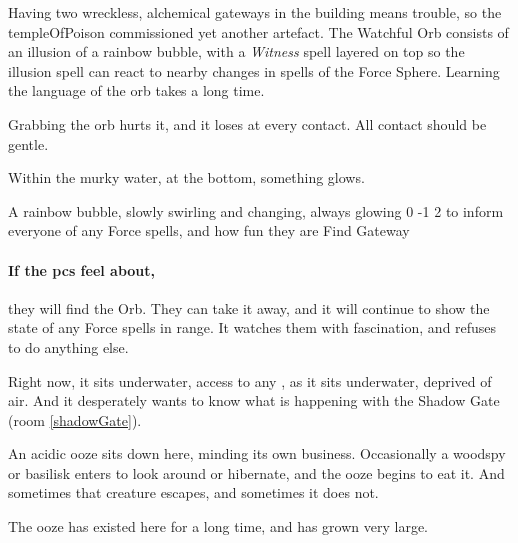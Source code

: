 
\begin{exampletext}
  Having two wreckless, alchemical gateways in the building means trouble, so the \gls{templeOfPoison} commissioned yet another \gls{artefact}.
  The Watchful Orb consists of an illusion of a rainbow bubble, with a \textit{Witness} spell layered on top so the illusion spell can react to nearby changes in spells of the Force Sphere.
  Learning the language of the orb takes a long time.

  Grabbing the orb hurts it, and it loses  at every contact.
  All contact should be gentle.
\end{exampletext}

\begin{boxtext}
  Within the murky water, at the bottom, something glows.
\end{boxtext}

  {A rainbow bubble, slowly swirling and changing, always glowing}%
  {0}%
  {-1}%
  {2}%
  {to inform everyone of any Force spells, and how fun they are}%
  {Find Gateway}%
  {
    \setcounter{Air}{3}
    \setcounter{Fire}{3}
    \setcounter{Earth}{1}
    \setcounter{Academics}{2}
    \setcounter{Xenomology}{2}
  }%

\showStdSpells[
  \setcounter{enc}{2}
  \findGatewaySpell
]

\paragraph{If the \glspl{pc} feel about,}
they will find the Orb.
They can take it away, and it will continue to show the state of any Force spells in range.
It watches them with fascination, and refuses to do anything else.

Right now, it sits underwater, access to any , as it sits underwater, deprived of air.
And it desperately wants to know what is happening with the Shadow Gate (room \vref{shadowGate}).


An acidic ooze sits down here, minding its own business.
Occasionally a woodspy or basilisk enters to look around or hibernate, and the ooze begins to eat it.
And sometimes that creature escapes, and sometimes it does not.

The ooze has existed here for a long time, and has grown very large.

